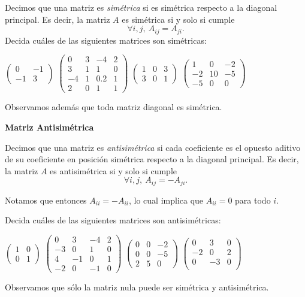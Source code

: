 \documentclass[12pt]{book}
\def\pq{\vspace{0.5cm}}
\begin{document}
Decimos que una matriz es  \emph{simétrica} si es simétrica respecto a la diagonal principal.
Es decir, la matriz $A$ es simétrica si y solo si cumple
  $$\forall i,j,\ A_{ij}=A_{ji}.$$
Decida cuáles de las siguientes matrices son simétricas:
\begin{center}
$\left(\begin{array}{rr}0& -1\\ -1& 3\end{array}\right)$\qquad
$\left(\begin{array}{rrrr}0& 3&-4&2\\ 3& 1& 1&0\\ -4&1&0.2&1\\2&0&1&1\end{array}\right)$\qquad
$\left(\begin{array}{rrr}1& 0&3\\ 3& 0&1\end{array}\right)$\qquad
$\left(\begin{array}{rrr}1& 0&-2\\ -2& 10&-5\\-5&0&0\end{array}\right)$
\end{center} 
Observamos además que toda matriz diagonal es simétrica.

 \pq

{\bf Matriz Antisimétrica}

Decimos que una matriz es  \emph{antisimétrica} si cada coeficiente es el opuesto aditivo de su coeficiente en posición simétrica respecto a la diagonal principal.
Es decir, la matriz $A$ es antisimétrica si y solo si cumple
$$\forall i,j,\ A_{ij}=-A_{ji}.$$

Notamos que entonces $A_{ii}=-A_{ii}$, lo cual implica que $A_{ii}=0$ para todo $i$.

Decida cuáles de las siguientes matrices son antisimétricas:
\begin{center}
$\left(\begin{array}{rr}1& 0\\ 0& 1\end{array}\right)$\qquad
$\left(\begin{array}{rrrr}0& 3&-4&2\\ -3& 0& 1&0\\ 4&-1&0&1\\-2&0&-1&0\end{array}\right)$\qquad
$\left(\begin{array}{rrr}0& 0&-2\\ 0& 0&-5\\2&5&0\end{array}\right)$\qquad
$\left(\begin{array}{rrr}0& 3&0\\ -2& 0&2\\0&-3&0\\\end{array}\right)$\qquad
\end{center}
 \color{black}Observamos que sólo la matriz nula puede ser simétrica y antisimétrica.
\end{document}
